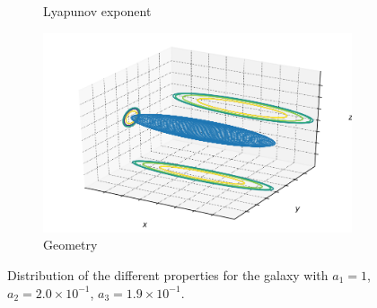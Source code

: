 \begin{figure}[h]
\begin{subfigure}[t]{0.4\textwidth}
        \caption{Lyapunov exponent}
    \end{subfigure}
    \begin{subfigure}[t]{0.4\textwidth}
        \includegraphics[width=\textwidth]{"../Files/Week 13/images/11_ellipsoid"}
        \caption{Geometry}
    \end{subfigure}
    \caption{Distribution of the different properties for the galaxy with $a_1 = 1$, $a_2 = 2.0\times10^{-1}$, $a_3 = 1.9\times10^{-1}$.}
\end{figure}


